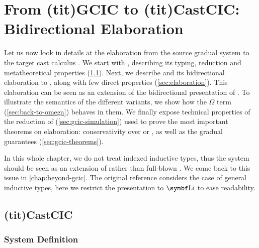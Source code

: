 \chapter{From \kl(tit){GCIC} to \kl(tit){CastCIC}: Bidirectional Elaboration}
\label{chap:bidir-gradual-elab}

\margintoc

Let us now look in details at the elaboration from the source gradual
system  to the target
cast calculus . We start with , describing its typing, reduction
and metatheoretical properties (\cref{sec:cast-calculus}).
%
Next, we describe  and its bidirectional elaboration to
, along with few direct properties (\cref{sec:elaboration}).
This elaboration can be seen as an extension of the bidirectional presentation of
.
%
To illustrate the semantics of the different  variants, we show how
the $\Omega$ term (\cref{sec:back-to-omega}) behaves in them.
We finally expose technical properties
of the reduction of  (\cref{sec:gcic-simulation}) used to prove the most
important theorems on elaboration: conservativity over  or , as well as
the gradual guarantees (\cref{sec:gcic-theorems}).

In this whole chapter, we do not treat indexed inductive types, thus the system should be
seen as an extension of  rather than full-blown . We come back to this
issue in \cref{chap:beyond-gcic}. The original reference 
considers the case of general inductive types, here we restrict the presentation to
$\List$ to ease readability.

\section{\kl(tit){CastCIC}}
\label{sec:cast-calculus}

\subsection{System Definition}

